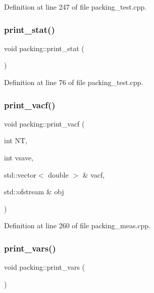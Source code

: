 Definition at line 247 of file packing\+\_\+test.\+cpp.

\mbox{\label{classpacking_a82af7804db28ae21d1b049190a4cc7d9}} 
\subsubsection{\texorpdfstring{print\+\_\+stat()}{print\_stat()}}
{\footnotesize\ttfamily void packing\+::print\+\_\+stat (\begin{DoxyParamCaption}{ }\end{DoxyParamCaption})}



Definition at line 76 of file packing\+\_\+test.\+cpp.

\mbox{\label{classpacking_a50f911bdce5d1a3c81bd73eb3a77fd0e}} 
\subsubsection{\texorpdfstring{print\+\_\+vacf()}{print\_vacf()}}
{\footnotesize\ttfamily void packing\+::print\+\_\+vacf (\begin{DoxyParamCaption}\item[{int}]{NT,  }\item[{int}]{vsave,  }\item[{std\+::vector$<$ double $>$ \&}]{vacf,  }\item[{std\+::ofstream \&}]{obj }\end{DoxyParamCaption})}



Definition at line 260 of file packing\+\_\+meas.\+cpp.

\mbox{\label{classpacking_a153155d72d5c0ba11f22939ec59c7c87}} 
\subsubsection{\texorpdfstring{print\+\_\+vars()}{print\_vars()}}
{\footnotesize\ttfamily void packing\+::print\+\_\+vars (\begin{DoxyParamCaption}{ }\end{DoxyParamCaption})}



